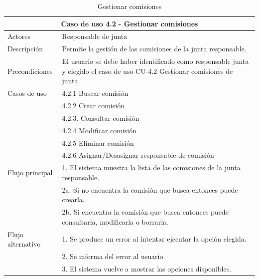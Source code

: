 \begin{table}[H]
    \caption{Gestionar comisiones}
    \label{tab:CU-4.2}
    \begin{center}
        \begin{tabular}{|l|p{12cm}|}
            \hline
            \multicolumn{2}{|c|}{Caso de uso 4.2 - Gestionar comisiones} \\
            \hline \hline
            Actores                 &   Responsable de junta          \\  
            \hline
            Descripción             &   Permite la gestión de las comisiones de la junta responsable. \\  \hline
            Precondiciones          &   El usuario se debe haber identificado como responsable junta y elegido el caso de uso CU-4.2 Gestionar comisiones de junta. \\  \hline
            Casos de uso            & 
            4.2.1 Buscar comisión \\ 
            &
            4.2.2 Crear comisión \\ 
            & 
            4.2.3. Consultar comisión\\ 
            & 
            4.2.4 Modificar comisión \\ 
            &  
            4.2.5 Eliminar comisión \\ 
            &
            4.2.6 Asignar/Desasignar responsable de comisión \\
            \hline
   
            Flujo principal         &   1. El sistema muestra la lista de las comisiones de la junta responsable.   \\ 
            & 2a. Si no encuentra la comisión que busca entonces puede crearla. \\ 
            & 2b. Si encuentra la comisión que busca entonces puede consultarla, modificarla o borrarla. \\ \hline
            Flujo alternativo    &   1. Se produce un error al intentar ejecutar la opción elegida.  \\ 
            & 2. Se informa del error al usuario. \\
            & 3. El sistema vuelve a mostrar las opciones disponibles. \\
            \hline
        \end{tabular}
    \end{center}
\end{table}

